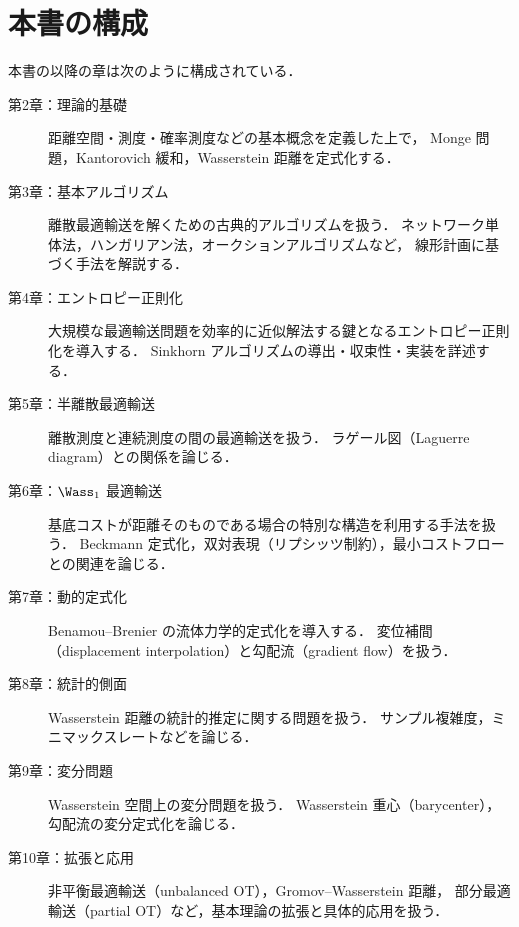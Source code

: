 \section{本書の構成}
\label{sec:book-structure}

本書の以降の章は次のように構成されている．

\begin{description}
  \item[第2章：理論的基礎]
    距離空間・測度・確率測度などの基本概念を定義した上で，
    Monge 問題，Kantorovich 緩和，Wasserstein 距離を定式化する．

  \item[第3章：基本アルゴリズム]
    離散最適輸送を解くための古典的アルゴリズムを扱う．
    ネットワーク単体法，ハンガリアン法，オークションアルゴリズムなど，
    線形計画に基づく手法を解説する．

  \item[第4章：エントロピー正則化]
    大規模な最適輸送問題を効率的に近似解法する鍵となるエントロピー正則化を導入する．
    Sinkhorn アルゴリズムの導出・収束性・実装を詳述する．

  \item[第5章：半離散最適輸送]
    離散測度と連続測度の間の最適輸送を扱う．
    ラゲール図（Laguerre diagram）との関係を論じる．

  \item[第6章：$\Wass_1$ 最適輸送]
    基底コストが距離そのものである場合の特別な構造を利用する手法を扱う．
    Beckmann 定式化，双対表現（リプシッツ制約），最小コストフローとの関連を論じる．

  \item[第7章：動的定式化]
    Benamou--Brenier の流体力学的定式化を導入する．
    変位補間（displacement interpolation）と勾配流（gradient flow）を扱う．

  \item[第8章：統計的側面]
    Wasserstein 距離の統計的推定に関する問題を扱う．
    サンプル複雑度，ミニマックスレートなどを論じる．

  \item[第9章：変分問題]
    Wasserstein 空間上の変分問題を扱う．
    Wasserstein 重心（barycenter），勾配流の変分定式化を論じる．

  \item[第10章：拡張と応用]
    非平衡最適輸送（unbalanced OT），Gromov--Wasserstein 距離，
    部分最適輸送（partial OT）など，基本理論の拡張と具体的応用を扱う．
\end{description}

